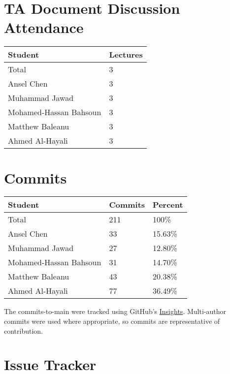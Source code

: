 \documentclass{article}
\begin{document}
\section{TA Document Discussion Attendance}

\begin{table}[H]
\centering
\begin{tabular}{ll}
\toprule
\textbf{Student} & \textbf{Lectures}\\
\midrule
Total & 3\\
Ansel Chen & 3\\
Muhammad Jawad & 3\\
Mohamed-Hassan Bahsoun & 3\\
Matthew Baleanu & 3\\
Ahmed Al-Hayali & 3\\
\bottomrule
\end{tabular}
\end{table}

\section{Commits}

\begin{table}[H]
\centering
\begin{tabular}{lll}
\toprule
\textbf{Student} & \textbf{Commits} & \textbf{Percent}\\
\midrule
Total & 211 & 100\% \\
Ansel Chen & 33 & 15.63\% \\
Muhammad Jawad & 27 & 12.80\% \\
Mohamed-Hassan Bahsoun & 31 & 14.70\% \\
Matthew Baleanu & 43 & 20.38\% \\
Ahmed Al-Hayali & 77 & 36.49\% \\
\bottomrule
\end{tabular}
\end{table}

The commits-to-main were tracked using GitHub's \href{https://github.com/AhmedAl-Hayali/GenreGuru/graphs/contributors}{Insights}. Multi-author commits were used where appropriate, so commits are representative of contribution.

\section{Issue Tracker}

\end{document}

